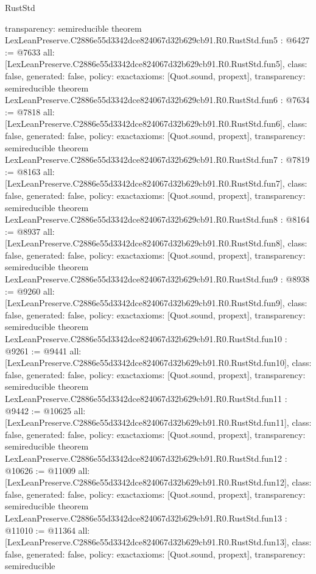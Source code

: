 \begin{lexlean}{RustStd}
\begin{coremodule}
{  transparency: semireducible
}
theorem LexLeanPreserve.C2886e55d3342dce824067d32b629cb91.R0.RustStd.fun5 : @6427 := @7633 {
  all: [LexLeanPreserve.C2886e55d3342dce824067d32b629cb91.R0.RustStd.fun5],
  class: false,
  generated: false,
  policy: exact{axioms: [Quot.sound, propext]},
  transparency: semireducible
}
theorem LexLeanPreserve.C2886e55d3342dce824067d32b629cb91.R0.RustStd.fun6 : @7634 := @7818 {
  all: [LexLeanPreserve.C2886e55d3342dce824067d32b629cb91.R0.RustStd.fun6],
  class: false,
  generated: false,
  policy: exact{axioms: [Quot.sound, propext]},
  transparency: semireducible
}
theorem LexLeanPreserve.C2886e55d3342dce824067d32b629cb91.R0.RustStd.fun7 : @7819 := @8163 {
  all: [LexLeanPreserve.C2886e55d3342dce824067d32b629cb91.R0.RustStd.fun7],
  class: false,
  generated: false,
  policy: exact{axioms: [Quot.sound, propext]},
  transparency: semireducible
}
theorem LexLeanPreserve.C2886e55d3342dce824067d32b629cb91.R0.RustStd.fun8 : @8164 := @8937 {
  all: [LexLeanPreserve.C2886e55d3342dce824067d32b629cb91.R0.RustStd.fun8],
  class: false,
  generated: false,
  policy: exact{axioms: [Quot.sound, propext]},
  transparency: semireducible
}
theorem LexLeanPreserve.C2886e55d3342dce824067d32b629cb91.R0.RustStd.fun9 : @8938 := @9260 {
  all: [LexLeanPreserve.C2886e55d3342dce824067d32b629cb91.R0.RustStd.fun9],
  class: false,
  generated: false,
  policy: exact{axioms: [Quot.sound, propext]},
  transparency: semireducible
}
theorem LexLeanPreserve.C2886e55d3342dce824067d32b629cb91.R0.RustStd.fun10 : @9261 := @9441 {
  all: [LexLeanPreserve.C2886e55d3342dce824067d32b629cb91.R0.RustStd.fun10],
  class: false,
  generated: false,
  policy: exact{axioms: [Quot.sound, propext]},
  transparency: semireducible
}
theorem LexLeanPreserve.C2886e55d3342dce824067d32b629cb91.R0.RustStd.fun11 : @9442 := @10625 {
  all: [LexLeanPreserve.C2886e55d3342dce824067d32b629cb91.R0.RustStd.fun11],
  class: false,
  generated: false,
  policy: exact{axioms: [Quot.sound, propext]},
  transparency: semireducible
}
theorem LexLeanPreserve.C2886e55d3342dce824067d32b629cb91.R0.RustStd.fun12 : @10626 := @11009 {
  all: [LexLeanPreserve.C2886e55d3342dce824067d32b629cb91.R0.RustStd.fun12],
  class: false,
  generated: false,
  policy: exact{axioms: [Quot.sound, propext]},
  transparency: semireducible
}
theorem LexLeanPreserve.C2886e55d3342dce824067d32b629cb91.R0.RustStd.fun13 : @11010 := @11364 {
  all: [LexLeanPreserve.C2886e55d3342dce824067d32b629cb91.R0.RustStd.fun13],
  class: false,
  generated: false,
  policy: exact{axioms: [Quot.sound, propext]},
  transparency: semireducible
}
\end{coremodule}
\end{lexlean}
